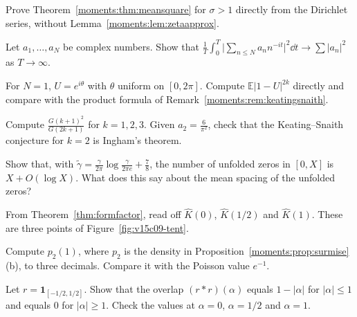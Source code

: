 \begin{exercise}[$\star$]\label{moments:ex:sigmagt1}
Prove Theorem~\ref{moments:thm:meansquare} for $\sigma>1$ directly from the Dirichlet series, without Lemma~\ref{moments:lem:zetaapprox}.
\end{exercise}

\begin{exercise}[$\star$]\label{moments:ex:fixedN}
Let $a_1,\dots,a_N$ be complex numbers. Show that $\frac1T\int_0^T\bigl|\sum_{n\le N}a_nn^{-it}\bigr|^2\dd t\to\sum|a_n|^2$ as $T\to\infty$.
\end{exercise}

\begin{exercise}[$\star\star$]\label{moments:ex:cue1}
For $N=1$, $U=e^{i\theta}$ with $\theta$ uniform on $[0,2\pi]$. Compute $\mathbb E|1-U|^{2k}$ directly and compare with the product formula of
Remark~\ref{moments:rem:keatingsnaith}.
\end{exercise}

\begin{exercise}[$\star$]\label{moments:ex:barnes}
Compute $\frac{G(k+1)^2}{G(2k+1)}$ for $k=1,2,3$. Given $a_2=\frac6{\pi^2}$, check that the Keating--Snaith conjecture for $k=2$ is Ingham's theorem.
\end{exercise}

\begin{exercise}[$\star\star$]\label{moments:ex:unfold}
Show that, with $\tilde\gamma=\frac\gamma{2\pi}\log\frac\gamma{2\pi e}+\frac78$, the number of unfolded zeros in $[0,X]$ is $X+O(\log X)$. What does this say about the
mean spacing of the unfolded zeros?
\end{exercise}

\begin{exercise}[$\star$]\label{ex:v15-09-1}
From Theorem~\ref{thm:formfactor}, read off \(\hat K(0)\), \(\hat K(1/2)\) and \(\hat K(1)\). These are three points of Figure~\ref{fig:v15c09-tent}.
\end{exercise}

\begin{exercise}[$\star$]\label{ex:v15-09-2}
Compute \(p_2(1)\), where \(p_2\) is the density in Proposition~\ref{moments:prop:surmise}(b), to three decimals. Compare it with the Poisson value \(e^{-1}\).
\end{exercise}

\begin{exercise}[$\star\star$]\label{ex:v15-09-3}
Let \(r=\mathbf 1_{[-1/2,1/2]}\). Show that the overlap \((r*r)(\alpha)\) equals \(1-|\alpha|\) for \(|\alpha|\le1\) and equals \(0\) for \(|\alpha|\ge1\). Check the values at \(\alpha=0\), \(\alpha=1/2\) and \(\alpha=1\).
\end{exercise}

